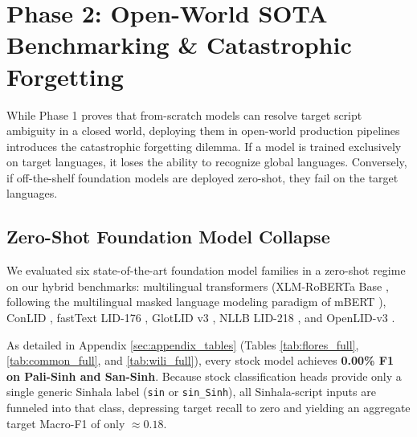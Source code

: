 \documentclass[11pt]{article}
\begin{document}
\FloatBarrier
\section{Phase 2: Open-World SOTA Benchmarking \& Catastrophic Forgetting}
\label{sec:phase2_open_world}

While Phase 1 proves that from-scratch models can resolve target script ambiguity in a closed world, deploying them in open-world production pipelines introduces the catastrophic forgetting dilemma. If a model is trained exclusively on target languages, it loses the ability to recognize global languages. Conversely, if off-the-shelf foundation models are deployed zero-shot, they fail on the target languages.

\subsection{Zero-Shot Foundation Model Collapse}
We evaluated six state-of-the-art foundation model families in a zero-shot regime on our hybrid benchmarks: multilingual transformers (XLM-RoBERTa Base \cite{conneau2020unsupervised}, following the multilingual masked language modeling paradigm of mBERT \cite{devlin2019bert}), ConLID \cite{dunn2023commonlid}, fastText LID-176 \cite{joulin2017bag}, GlotLID v3 \cite{kargaran2023glotlid}, NLLB LID-218 \cite{nllb2022}, and OpenLID-v3 \cite{burchell2023openlid}.

As detailed in Appendix \ref{sec:appendix_tables} (Tables \ref{tab:flores_full}, \ref{tab:common_full}, and \ref{tab:wili_full}), every stock model achieves \textbf{0.00\% F1 on Pali-Sinh and San-Sinh}. Because stock classification heads provide only a single generic Sinhala label (\texttt{sin} or \texttt{sin\_Sinh}), all Sinhala-script inputs are funneled into that class, depressing target recall to zero and yielding an aggregate target Macro-F1 of only $\approx 0.18$.
\end{document}
